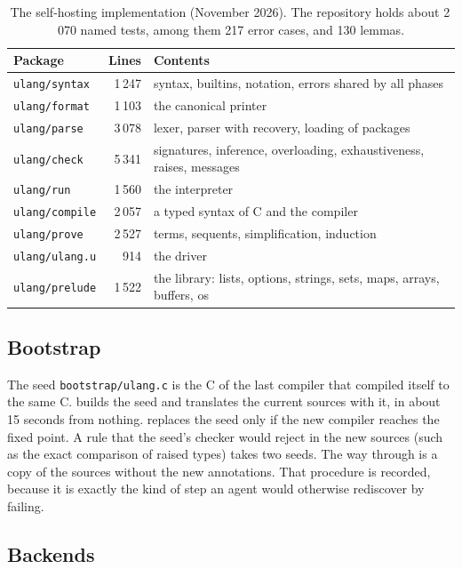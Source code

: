 \documentclass[11pt,a4paper]{article}
\newcommand{\code}[1]{\texttt{\detokenize{#1}}}
\newcommand{\file}[1]{\texttt{#1}}
\begin{document}
\begin{table}[t]
\centering\small
\begin{tabular}{@{}lrl@{}}
\toprule
\textbf{Package} & \textbf{Lines} & \textbf{Contents} \\
\midrule
\file{ulang/syntax}  & 1\,247 & syntax, builtins, notation, errors shared by all phases \\
\file{ulang/format}  & 1\,103 & the canonical printer \\
\file{ulang/parse}   & 3\,078 & lexer, parser with recovery, loading of packages \\
\file{ulang/check}   & 5\,341 & signatures, inference, overloading, exhaustiveness, raises, messages \\
\file{ulang/run}     & 1\,560 & the interpreter \\
\file{ulang/compile} & 2\,057 & a typed syntax of C and the compiler \\
\file{ulang/prove}   & 2\,527 & terms, sequents, simplification, induction \\
\file{ulang/ulang.u} &   914 & the driver \\
\file{ulang/prelude} & 1\,522 & the library: lists, options, strings, sets, maps, arrays, buffers, os \\
\bottomrule
\end{tabular}
\caption{The self-hosting implementation (November 2026). The repository holds about 2\,070
named tests, among them 217 error cases, and 130 lemmas.}
\label{tab:size}
\end{table}

\subsection{Bootstrap}

The seed \file{bootstrap/ulang.c} is the C of the last compiler that compiled itself to the
same C. \code{make} builds the seed and translates the current sources with it, in about 15
seconds from nothing. \code{make selfcompile} replaces the seed only if the new compiler
reaches the fixed point. A rule that the seed's checker would reject in the new sources
(such as the exact comparison of raised types) takes two seeds. The way through is a copy of
the sources without the new annotations. That procedure is recorded, because it is exactly
the kind of step an agent would otherwise rediscover by failing.

\subsection{Backends}
\end{document}
